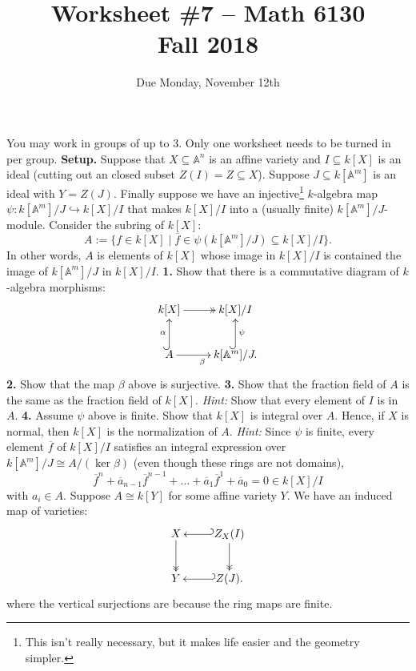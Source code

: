 \documentclass[11pt]{amsart}
\theoremstyle{theorem}
\newcommand{\bA}{\mathbb{A}}
\begin{document}
\title{Worksheet \#7 -- Math 6130\\Fall 2018}
\author{Due Monday, November 12th}

\maketitle
You may work in groups of up to 3.  Only one worksheet needs to be turned in per group.
\vskip 9pt
\noindent
{\bf Setup.}  Suppose that $X \subseteq \bA^n$ is an affine variety and $I \subseteq k[X]$ is an ideal (cutting out an closed subset $Z(I) = Z \subseteq X$).  Suppose $J \subseteq k[\bA^m]$ is an ideal with $Y = Z(J)$.  Finally suppose we have an injective\footnote{This isn't really necessary, but it makes life easier and the geometry simpler.} $k$-algebra map $\psi : k[\bA^m]/J \hookrightarrow k[X]/I$ that makes $k[X]/I$ into a (usually finite) $k[\bA^m]/J$-module.
\vskip 3pt
Consider the subring of $k[X]$:
\[
A := \{ f \in k[X] \;|\; \overline{f} \in \psi(k[\bA^m]/J) \subseteq k[X]/I \}.
\]
In other words, $A$ is elements of $k[X]$ whose image in $k[X]/I$ is contained the image of $k[\bA^m]/J$ in $k[X]/I$.
\vskip 9pt
\noindent
{\bf 1.}  Show that there is a commutative diagram of $k$-algebra morphisms:
\[
\xymatrix{
k[X] \ar@{->>}[r] & k[X]/I \\
A \ar@{^{(}->}[u]^{\alpha} \ar[r]_{\beta} & k[\bA^m]/J \ar@{^{(}->}[u]_{\psi}.
}
\]
\vskip 150pt
\noindent
{\bf 2.}  Show that the map $\beta$ above is surjective.
\newpage
\noindent
{\bf 3.}  Show that the fraction field of $A$ is the same as the fraction field of $k[X]$.
\vskip 3pt
\emph{Hint:} Show that every element of $I$ is in $A$.
\vskip 150pt
\noindent
{\bf 4.}  Assume $\psi$ above is finite.  Show that $k[X]$ is integral over $A$.  Hence, if $X$ is normal, then $k[X]$ is the normalization of $A$.
\vskip 3pt
\emph{Hint:} Since $\psi$ is finite, every element $\overline{f}$ of $k[X]/I$ satisfies an integral expression over $k[\bA^m]/J \cong A/(\ker \beta)$ (even though these rings are not domains),
\[
\overline{f}^n + \overline{a}_{n-1} \overline{f}^{n-1} + \dots + \overline{a}_1 \overline{f}^{1} + \overline{a}_0 = 0 \in k[X]/I
\]
with $a_i \in A$.  %
\vfill
Suppose $A \cong k[Y]$ for some affine variety $Y$.  We have an induced map of varieties:
\[
\xymatrix{
X \ar@{->>}[d] & \ar@{_{(}->}[l] Z_X(I) \ar@{->>}[d] \\
Y & \ar@{_{(}->}[l] Z(J).
}
\]
where the vertical surjections are because the ring maps are finite.
\end{document}
